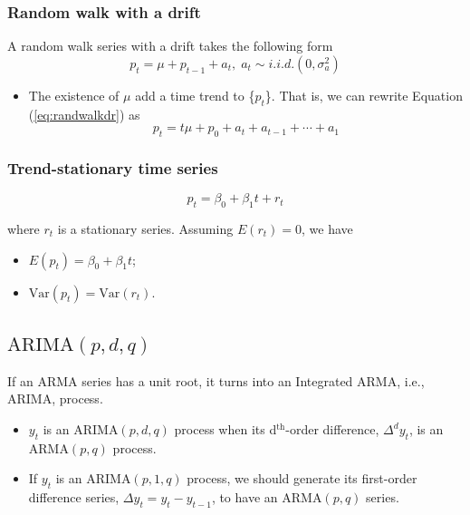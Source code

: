 \documentclass[a4paper,11pt]{article}
\newcommand{\var}{\mathrm{Var}}
\begin{document}
\subsubsection*{Random walk with a drift}
\label{sec:orgcd3bb14}

A random walk series with a drift takes the following form
\begin{equation}
\label{eq:randwalkdr}
p_t = \mu + p_{t-1} + a_t,\; a_t \sim i.i.d.(0, \sigma^2_a)
\end{equation}

\begin{itemize}
\item The existence of \(\mu\) add a time trend to \{\(p_t\)\}. That is, we can
rewrite Equation (\ref{eq:randwalkdr}) as
\[ p_t = t\mu + p_0 + a_t + a_{t-1} + \cdots + a_1 \]
\end{itemize}

\subsubsection*{Trend-stationary time series}
\label{sec:org8cfe332}

\begin{equation}
\label{eq:time-stationary}
p_t = \beta_0 + \beta_1 t + r_t
\end{equation}

where \(r_t\) is a stationary series. Assuming \(E(r_t) = 0\), we have 
\begin{itemize}
\item \(E(p_t) = \beta_0 + \beta_1 t\);
\item \(\var(p_t) = \var(r_t)\).
\end{itemize}


\subsection{\(\mathrm{ARIMA}(p,d,q)\)}
\label{sec:org921d110}

If an ARMA series has a unit root, it turns into an Integrated ARMA,
i.e., ARIMA, process.

\begin{itemize}
\item \(y_t\) is an \(\mathrm{ARIMA}(p, d, q)\) process when its d\(^{\text{th}}\)-order
difference, \(\Delta^d y_t\), is an \(\mathrm{ARMA}(p,
  q)\) process.

\item If \(y_t\) is an \(\mathrm{ARIMA}(p, 1, q)\) process, we should
generate its first-order difference series, \(\Delta y_t = y_t -
  y_{t-1}\), to have an \(\mathrm{ARMA}(p, q)\) series.
\end{itemize}
\end{document}
